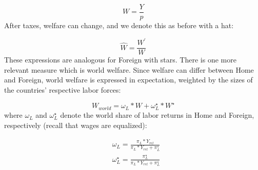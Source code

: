 \documentclass[notitlepage,12pt]{article}
\begin{document}
\begin{equation*}
W = \frac{Y}{p}
\end{equation*}
After taxes, welfare can change, and we denote this as before with a hat:

\begin{equation*}
\hat{W} = \frac{W^\prime}{W}
\end{equation*}
These expressions are analogous for Foreign with stars. There is one more relevant measure which is world welfare. Since welfare can differ between Home and Foreign, world welfare is expressed in expectation, weighted by the sizes of the countries' respective labor forces:

\begin{equation}
W_{world} = \omega_L*W + \omega_L^\star*W^\star
\end{equation}
where $\omega_L$ and $\omega_L^\star$ denote the world share of labor returns in Home and Foreign, respectively (recall that wages are equalized):

\begin{align}
&\omega_L = \frac{\pi_L*Y_{rel}}{\pi_L*Y_{rel} + \pi_L^\star}\\
&\omega_L^\star = \frac{\pi_L^\star}{\pi_L*Y_{rel} + \pi_L^\star}
\end{align}
\end{document}
